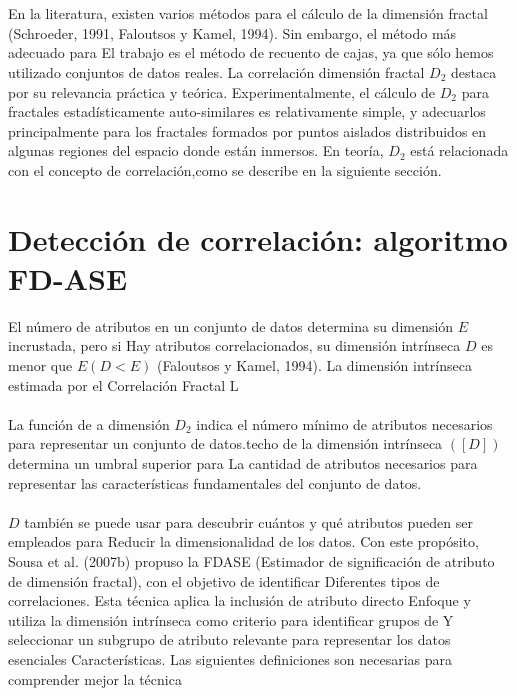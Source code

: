 \\\\

En la literatura, existen varios métodos para el cálculo de la dimensión fractal
(Schroeder, 1991, Faloutsos y Kamel, 1994). Sin embargo, el método más adecuado para
El trabajo es el método de recuento de cajas, ya que sólo hemos utilizado conjuntos de datos reales. La correlación dimensión fractal $D_2$ destaca por su relevancia práctica y teórica. Experimentalmente, el cálculo de $D_2$ para fractales estadísticamente auto-similares es relativamente simple, y adecuarlos principalmente para los fractales formados por puntos aislados distribuidos en algunas regiones del espacio donde están inmersos. En teoría, $D_2$ está relacionada con el concepto de correlación,como se describe en la siguiente sección.

\section{Detección de correlación: algoritmo FD-ASE}

El número de atributos en un conjunto de datos determina su dimensión $E$ incrustada, pero si
Hay atributos correlacionados, su dimensión intrínseca $D$ es menor que $E (D < E)$
(Faloutsos y Kamel, 1994). La dimensión intrínseca estimada por el Correlación Fractal
L
\\\\
La función de a dimensión $D_2$ indica el número mínimo de atributos necesarios para representar un conjunto de datos.techo de la dimensión intrínseca $([D])$ determina un umbral superior para
La cantidad de atributos necesarios para representar las características fundamentales del conjunto de datos.
\\\\
$D$ también se puede usar para descubrir cuántos y qué atributos pueden ser empleados para
Reducir la dimensionalidad de los datos. Con este propósito, Sousa et al. (2007b) propuso la FDASE
(Estimador de significación de atributo de dimensión fractal), con el objetivo de identificar
Diferentes tipos de correlaciones. Esta técnica aplica la inclusión de atributo directo
Enfoque y utiliza la dimensión intrínseca como criterio para identificar grupos de
Y seleccionar un subgrupo de atributo relevante para representar los datos esenciales
Características. Las siguientes definiciones son necesarias para comprender mejor la técnica
\\\\

